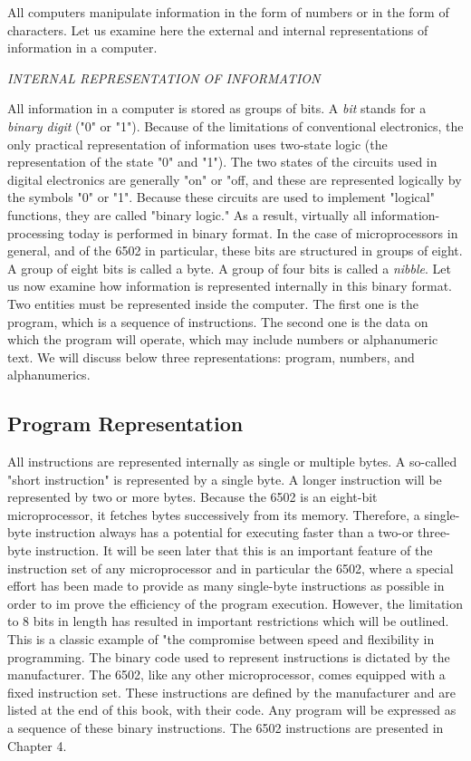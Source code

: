 \documentclass{book}
\begin{document}
All computers manipulate information in the form of numbers or
in the form of characters. Let us examine here the external and
internal representations of information in a computer.

\textit{INTERNAL REPRESENTATION OF INFORMATION}

All information in a computer is stored as groups of bits. A \textit{bit}
stands for a \textit{binary digit} ("0" or "1"). Because of the limitations
of conventional electronics, the only practical representation of information uses two-state logic (the representation of the state "0" and
"1"). The two states of the circuits used in digital electronics
are generally "on" or "off, and these are represented logically by the symbols "0" or "1". Because these circuits are
used to implement "logical" functions, they are called "binary
logic." As a result, virtually all information-processing today is
performed in binary format. In the case of microprocessors in
general, and of the 6502 in particular, these bits are structured in
groups of eight. A group of eight bits is called a byte. A group of
four bits is called a \textit{nibble}.
Let us now examine how information is represented internally in
this binary format. Two entities must be represented inside the
computer. The first one is the program, which is a sequence of
instructions. The second one is the data on which the program will
operate, which may include numbers or alphanumeric text. We will
discuss below three representations: program, numbers, and alphanumerics.

\subsection*{Program Representation}
All instructions are represented internally as single or multiple
bytes. A so-called "short instruction" is represented by a single
byte. A longer instruction will be represented by two or more
bytes. Because the 6502 is an eight-bit microprocessor, it fetches
bytes successively from its memory. Therefore, a single-byte
instruction always has a potential for executing faster than a two-or
three-byte instruction. It will be seen later that this is an important feature of the instruction set of any microprocessor and in
particular the 6502, where a special effort has been made to provide as many single-byte instructions as possible in order to im
prove the efficiency of the program execution. However, the limitation to 8 bits in length has resulted in important restrictions which
will be outlined. This is a classic example of "the compromise between speed and flexibility in programming. The binary code used
to represent instructions is dictated by the manufacturer. The
6502, like any other microprocessor, comes equipped with a fixed
instruction set. These instructions are defined by the manufacturer and are listed at the end of this book, with their code. Any
program will be expressed as a sequence of these binary instructions. The 6502 instructions are presented in Chapter 4.
\end{document}
